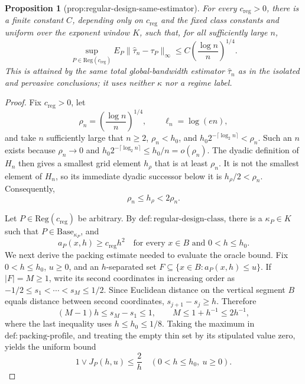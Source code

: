 \documentclass{article}
\newtheorem{proposition}{Proposition}
\begin{document}
\begin{proposition}[prop:regular-design-same-estimator]\label{prop:regular-design-same-estimator}
For every \(c_{\mathrm{reg}}>0\), there is a finite constant \(C\), depending only on \(c_{\mathrm{reg}}\) and the fixed class constants and uniform over the exponent window \(K\), such that, for all sufficiently large \(n\),
\[
 \sup_{P\in\mathrm{Reg}(c_{\mathrm{reg}})}
 E_P\|\widehat\tau_n-\tau_P\|_\infty
 \leq C\left(\frac{\log n}{n}\right)^{1/4}.
\]
This is attained by the same total global-bandwidth estimator \(\widehat\tau_n\) as in the isolated and pervasive conclusions; it uses neither \(\kappa\) nor a regime label.
\end{proposition}
\begin{proof}
Fix \(c_{\mathrm{reg}}>0\), let
\[
 \rho_n=\left(\frac{\log n}{n}\right)^{1/4},
 \qquad \ell_n=\log(en),
\]
and take \(n\) sufficiently large that \(n\geq2\), \(\rho_n<h_0\), and
\(h_0 2^{-\lceil\log_2 n\rceil}<\rho_n\).  Such an \(n\) exists because
\(\rho_n\to0\) and
\(h_0 2^{-\lceil\log_2 n\rceil}\leq h_0/n=o(\rho_n)\).  The dyadic
definition of \(H_n\) then gives a smallest grid element \(h_{\rho}\) that
is at least \(\rho_n\).  It is not the smallest element of \(H_n\), so its
immediate dyadic successor below it is \(h_{\rho}/2<\rho_n\).  Consequently,
\[
 \rho_n\leq h_{\rho}<2\rho_n. \tag{R1}
\]

Let \(P\in\mathrm{Reg}(c_{\mathrm{reg}})\) be arbitrary.  By
\(\mathrm{def{:}regular\text{-}design\text{-}class}\), there is a
\(\kappa_P\in K\) such that \(P\in\mathrm{Base}_{\kappa_P}\), and
\[
 a_P(x,h)\geq c_{\mathrm{reg}}h^2
 \quad\text{for every }x\in B\text{ and }0<h\leq h_0. \tag{R2}
\]
We next derive the packing estimate needed to evaluate the oracle bound.
Fix \(0<h\leq h_0\), \(u\geq0\), and an \(h\)-separated set
\(F\subseteq\{x\in B:a_P(x,h)\leq u\}\).  If \(|F|=M\geq1\), write its
second coordinates in increasing order as
\(-1/2\leq s_1<\cdots<s_M\leq1/2\).  Since Euclidean distance on the
vertical segment \(B\) equals distance between second coordinates,
\(s_{j+1}-s_j\geq h\).  Therefore
\[
 (M-1)h\leq s_M-s_1\leq1,
 \qquad
 M\leq 1+h^{-1}\leq 2h^{-1}, \tag{R3}
\]
where the last inequality uses \(h\leq h_0\leq1/8\).  Taking the maximum
in \(\mathrm{def{:}packing\text{-}profile}\), and treating the empty thin
set by its stipulated value zero, yields the uniform bound
\[
 1\vee J_P(h,u)\leq\frac{2}{h}
 \quad(0<h\leq h_0,\ u\geq0). \tag{R4}
\]


\end{proof}
\end{document}
